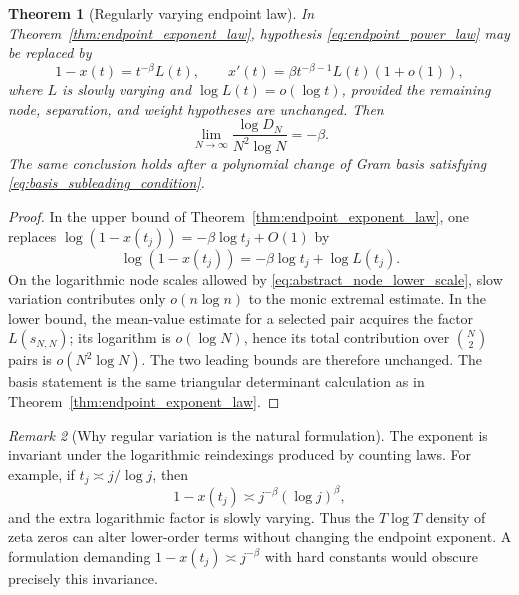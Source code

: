 \documentclass[11pt]{amsart}
\numberwithin{equation}{section}
\theoremstyle{plain}
\newtheorem{theorem}{Theorem}[section]
\theoremstyle{definition}
\theoremstyle{remark}
\newtheorem{remark}[theorem]{Remark}
\begin{document}
\begin{theorem}[Regularly varying endpoint law]
\label{thm:endpoint_regular_variation}
In Theorem~\ref{thm:endpoint_exponent_law}, hypothesis
\eqref{eq:endpoint_power_law} may be replaced by
\begin{equation}
1-x(t)=t^{-\beta}L(t),
\qquad
x'(t)=\beta t^{-\beta-1}L(t)(1+o(1)),
\label{eq:endpoint_regular_variation}
\end{equation}
where \(L\) is slowly varying and \(\log L(t)=o(\log t)\), provided the remaining node,
separation, and weight hypotheses are unchanged.  Then
\begin{equation}
\lim_{N\to\infty}\frac{\log D_N}{N^2\log N}=-\beta.
\label{eq:endpoint_regular_variation_limit}
\end{equation}
The same conclusion holds after a polynomial change of Gram basis satisfying
\eqref{eq:basis_subleading_condition}.
\end{theorem}

\begin{proof}
In the upper bound of Theorem~\ref{thm:endpoint_exponent_law}, one replaces
\(\log(1-x(t_j))=-\beta\log t_j+O(1)\) by
\[
\log(1-x(t_j))=-\beta\log t_j+\log L(t_j).
\]
On the logarithmic node scales allowed by \eqref{eq:abstract_node_lower_scale}, slow variation
contributes only \(o(n\log n)\) to the monic extremal estimate.  In the lower bound, the mean-value
estimate for a selected pair acquires the factor \(L(s_{N,N})\); its logarithm is
\(o(\log N)\), hence its total contribution over \(\binom N2\) pairs is
\(o(N^2\log N)\).  The two leading bounds are therefore unchanged.  The basis statement is the
same triangular determinant calculation as in Theorem~\ref{thm:endpoint_exponent_law}.
\end{proof}

\begin{remark}[Why regular variation is the natural formulation]
\label{rem:endpoint_regular_variation_natural}
The exponent is invariant under the logarithmic reindexings produced by counting laws.  For
example, if \(t_j\asymp j/\log j\), then
\[
1-x(t_j)\asymp j^{-\beta}(\log j)^\beta,
\]
and the extra logarithmic factor is slowly varying.  Thus the \(T\log T\) density of zeta zeros can
alter lower-order terms without changing the endpoint exponent.  A formulation demanding
\(1-x(t_j)\asymp j^{-\beta}\) with hard constants would obscure precisely this invariance.
\end{remark}
\end{document}
